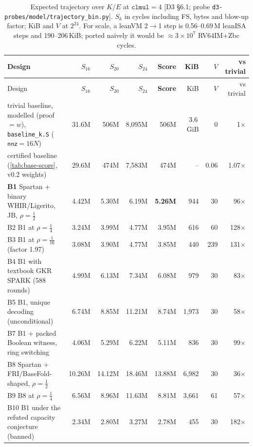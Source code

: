 \begingroup\footnotesize
\setlength{\tabcolsep}{4pt}
\renewcommand{\arraystretch}{1.08}
\begin{longtable}{@{}>{\raggedright\arraybackslash}p{}rrrrrrr@{}}
\caption{Expected trajectory over $K/E$ at $\mathtt{clmul}=4$ [D3 §6.1; probe
\texttt{d3-probes/model/trajectory\_bin.py}]. $S_k$ in cycles including FS, bytes and blow-up factor;
KiB and $V$ at $2^{24}$. For scale, a leanVM 2$\to$1 step is 0.56--0.69\,M leanISA steps
and 190--206\,KiB; ported naively it would be $\approx3\times10^7$ RV64IM+Zbc cycles.}\label{tab:bench-trajectory}\\
\toprule
Design & $S_{16}$ & $S_{20}$ & $S_{24}$ & \textbf{Score} & KiB & $V$ & vs trivial \\
\midrule
\endfirsthead
\toprule
Design & $S_{16}$ & $S_{20}$ & $S_{24}$ & \textbf{Score} & KiB & $V$ & vs trivial \\
\midrule
\endhead
trivial baseline, modelled (proof $=w$), \texttt{baseline\_k.S} ($\mathsf{nnz}=16N$) & 31.6M & 506M & 8{,}095M & 506M & 3.6\,GiB & 0 & 1$\times$ \\
certified baseline (\cref{tab:base-score}, v0.2 weights) & 29.6M & 474M & 7{,}583M & 474M & -- & 0.06 & 1.07$\times$ \\
\textbf{B1} Spartan + binary WHIR/Ligerito, JB, $\rho=\tfrac12$ & 4.42M & 5.30M & 6.19M & \textbf{5.26M} & 944 & 30 & 96$\times$ \\
B2 B1 at $\rho=\tfrac14$ & 3.24M & 3.99M & 4.77M & 3.95M & 616 & 60 & 128$\times$ \\
B3 B1 at $\rho=\tfrac1{16}$ (factor 1.97) & 3.08M & 3.90M & 4.77M & 3.85M & 440 & 239 & 131$\times$ \\
B4 B1 with textbook GKR SPARK (588 rounds) & 4.99M & 6.13M & 7.34M & 6.08M & 979 & 30 & 83$\times$ \\
B5 B1, unique decoding (unconditional) & 6.74M & 8.85M & 11.21M & 8.74M & 1{,}973 & 30 & 58$\times$ \\
B7 B1 + packed Boolean witness, ring switching & 4.06M & 5.29M & 6.22M & 5.11M & 836 & 30 & 99$\times$ \\
B8 Spartan + FRI/BaseFold-shaped, $\rho=\tfrac12$ & 10.26M & 14.12M & 18.46M & 13.88M & 6{,}982 & 30 & 36$\times$ \\
B9 B8 at $\rho=\tfrac14$ & 6.56M & 8.96M & 11.63M & 8.81M & 3{,}661 & 61 & 57$\times$ \\
B10 B1 under the refuted capacity conjecture (banned) & 2.34M & 2.80M & 3.27M & 2.78M & 455 & 30 & 182$\times$ \\
\bottomrule
\end{longtable}
\endgroup

